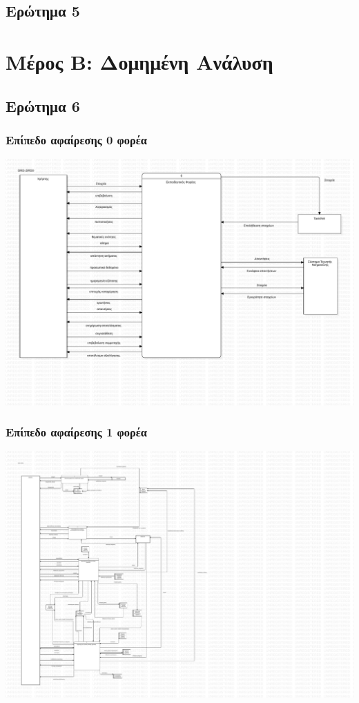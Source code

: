 \documentclass[a4paper, titlepage, twoside]{article}
\begin{document}
\subsection{Ερώτημα 5}
\label{sec:org3bccd44}

\section{Μέρος Β: Δομημένη Ανάλυση}
\label{sec:org7c58a39}

\subsection{Ερώτημα 6}
\label{sec:org33db79c}

\subsubsection{Επίπεδο αφαίρεσης 0 φορέα}
\label{sec:org665f318}
\begin{center}
\includegraphics[width=.9\linewidth]{drd0.pdf}
\end{center}
\subsubsection{Επίπεδο αφαίρεσης 1 φορέα}
\label{sec:org92df6f8}
\begin{center}
\includegraphics[width=.9\linewidth]{drd1.pdf}
\end{center}
\end{document}
